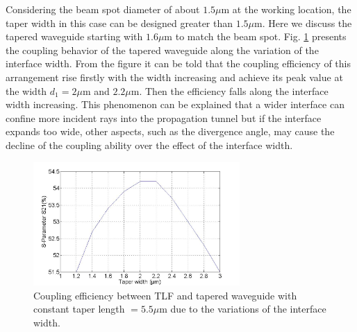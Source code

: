 Considering the beam spot diameter of about $1.5\mu$m at the working location, the taper width in this case can be designed greater than $1.5\mu$m. Here we discuss the tapered waveguide starting with $1.6\mu$m to match the beam spot. Fig. \ref{fig:tapered_waveguide_wxx} presents the coupling behavior of the tapered waveguide along the variation of the interface width. From the figure it can be told that the coupling efficiency of this arrangement rise firstly with the width increasing and achieve its peak value at the width $d_{1}=2\mu$m and $2.2\mu$m. Then the efficiency falls along the interface width increasing. This phenomenon can be explained that a wider interface can confine more incident rays into the propagation tunnel but if the interface expands too wide, other aspects, such as the divergence angle,  may cause the decline of the coupling ability over the effect of the interface width. 


\begin{figure}[!ht]
\centering
\includegraphics[width=0.7\textwidth]{bilder/tapered_waveguide_wxx}
\caption{Coupling efficiency between TLF and tapered waveguide with constant taper length $= 5.5\mu$m due to the variations of the interface width.}
\label{fig:tapered_waveguide_wxx}
\end{figure}
